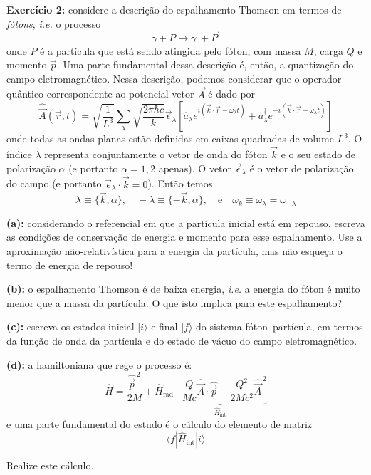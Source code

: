 \documentclass[12pt]{article}
\begin{document}
\textbf{Exercício 2:} considere a descrição do espalhamento Thomson em termos de \emph{fótons}, \textit{i.e.} o processo
\[
\gamma + P \to \gamma^\prime + P^\prime
\]
onde $P$ é a partícula que está sendo atingida pelo fóton, com massa $M$, carga $Q$ e momento $\vec{p}$.
Uma parte fundamental dessa descrição é, então, a quantização do campo eletromagnético.
Nessa descrição, podemos considerar que o operador quântico correspondente ao potencial vetor $\vec{A}$ é dado por
\[
\hat{\vec{A}}(\vec{r},t) = 
\sqrt{\frac{1}{L^{3}}} \sum_{\lambda} \sqrt{\frac{2 \pi \hbar c}{k}} \vec{\epsilon}_{\lambda}\left[\hat{a}_{\lambda} e^{i\left(\vec{k} \cdot \vec{r}-\omega_{\lambda} t\right)}+\hat{a}_{\lambda}^{\dagger} e^{-i\left(\vec{k} \cdot \vec{r}-\omega_{\lambda} t\right)}\right]
\]
onde todas as ondas planas estão definidas em caixas quadradas de volume $L^3$.
O índice $\lambda$ representa conjuntamente o vetor de onda do fóton $\vec{k}$ e o seu estado de polarização $\alpha$
(e portanto $\alpha=1,2$ apenas).
O vetor $\vec{\epsilon}_{\lambda}$ é o vetor de polarização do campo (e portanto $\vec{\epsilon}_{\lambda} \cdot \vec{k} = 0$).
Então temos
\[
\lambda \equiv\{\vec{k}, \alpha\}, \quad-\lambda \equiv\{-\vec{k}, \alpha\}, \quad \mathrm{e} \quad \omega_{k} \equiv \omega_{\lambda}=\omega_{-\lambda}
\]

\textbf{(a):} considerando o referencial em que a partícula inicial está em repouso, escreva as condições de conservação de energia e momento para esse espalhamento. Use a aproximação não-relativística para a energia da partícula, mas não esqueça o termo de energia de repouso!

\textbf{(b):} o espalhamento Thomson é de baixa energia, \textit{i.e.} a energia do fóton é muito menor que a massa da partícula.
O que isto implica para este espalhamento?

\textbf{(c):} escreva os estados inicial $|i\rangle$ e final $|f\rangle$ do sistema fóton--partícula, 
em termos da função de onda da partícula e do estado de vácuo do campo eletromagnético.

\textbf{(d):} a hamiltoniana que rege o processo é:
\[
\hat{H} = \frac{\hat{\vec{p}}^{\,2}}{2M}
+ \hat{H}_{\text{rad}} 
\underbrace{- \frac{Q}{Mc} \hat{\vec{A}} \cdot \hat{\vec{p}} 
- \frac{Q^2}{2Mc^2} \hat{\vec{A}}^{\,2}}%
_{\hat{H}_{\text{int}}}
\]
e uma parte fundamental do estudo é o cálculo do elemento de matriz
\[
\langle f|\hat{H}_{\text{int}}|i\rangle
\]

Realize este cálculo.
\end{document}
